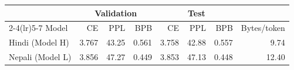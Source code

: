 \begin{tabular}{lrrrrrrr}
\toprule
& \multicolumn{3}{c}{Validation} & \multicolumn{3}{c}{Test} & \\
\cmidrule(lr){2-4}\cmidrule(lr){5-7}
Model & CE & PPL & BPB & CE & PPL & BPB & Bytes/token \\
\midrule
Hindi (Model H) & 3.767 & 43.25 & 0.561 & 3.758 & 42.88 & 0.557 & 9.74 \\
Nepali (Model L) & 3.856 & 47.27 & 0.449 & 3.853 & 47.13 & 0.448 & 12.40 \\
\bottomrule
\end{tabular}
